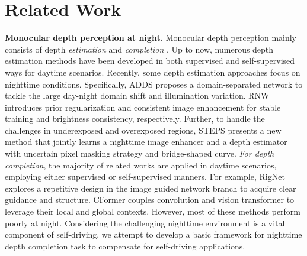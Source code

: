 \documentclass[lettersize,journal]{IEEEtran}
\begin{document}
\section{Related Work}
\textbf{Monocular depth perception at night.} 
Monocular depth perception mainly consists of depth \emph{estimation} \cite{zhou2017unsupervised} and \emph{completion} \cite{Uhrig2017THREEDV}. Up to now, numerous depth estimation methods have been developed in both supervised \cite{liu2023va,piccinelli2023idisc} and self-supervised \cite{zhou2017unsupervised,yan2021channel} ways for daytime scenarios. Recently, some depth estimation approaches \cite{vankadari2020unsupervised,spencer2020defeat,wang2021regularizing,liu2021self,zheng2023steps} focus on nighttime conditions. Specifically, ADDS \cite{liu2021self} proposes a domain-separated network to tackle the large day-night domain shift and illumination variation. RNW \cite{wang2021regularizing} introduces prior regularization and consistent image enhancement for stable training and brightness consistency, respectively. Further, to handle the challenges in underexposed and overexposed regions, STEPS \cite{zheng2023steps} presents a new method that jointly learns a nighttime image enhancer and a depth estimator with uncertain pixel masking strategy and bridge-shaped curve. \emph{For depth completion}, the majority of related works are applied in daytime scenarios, employing either supervised \cite{eldesokey2019confidence,park2020nonlocal,yan2022rignet,lin2022dynamic,Zhang2023CompletionFormer} or self-supervised \cite{wong2021unsupervised,yan2022desnet} manners. For example, RigNet \cite{yan2022rignet} explores a repetitive design in the image guided network branch to acquire clear guidance and structure. CFormer \cite{Zhang2023CompletionFormer} couples convolution and vision transformer to leverage their local and global contexts. However, most of these methods perform poorly at night. %
Considering the challenging nighttime environment is a vital component of self-driving, we attempt to develop a basic framework for nighttime depth completion task to compensate for self-driving applications. 
\end{document}
